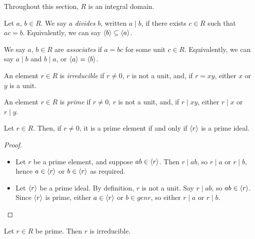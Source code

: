 \documentclass{../template/note}
\begin{document}
    Throughout this section, $R$ is an integral domain.

    \begin{definition}[Division]
        Let $a$, $b \in R$. We say $a$ \emph{divides} $b$, written $a \mid b$, if there exists $c \in R$ such that $ac = b$. Equivalently, we can say $\left \langle b \right \rangle \subseteq \left \langle a \right \rangle$.
    \end{definition}
    
    \begin{definition}[Associates]
        We say $a$, $b \in R$ are \emph{associates} if $a = bc$ for some unit $c \in R$. Equivalently, we can say $a \mid b$ and $b \mid a$, or $\left \langle a \right \rangle = \left \langle b \right \rangle$.
    \end{definition}
    
    \begin{definition}
        An element $r \in R$ is \emph{irreducible} if $r \neq 0$, $r$ is not a unit, and, if $r = xy$, either $x$ or $y$ is a unit.
    \end{definition}
    
    \begin{definition}
        An element $r \in R$ is \emph{prime} if $r \neq 0$, $r$ is not a unit, and, if $r \mid xy$, either $r \mid x$ or $r \mid y$.
    \end{definition}
    
    \begin{proposition}
        Let $r \in R$. Then, if $r \neq 0$, it is a prime element if and only if $\left \langle r \right \rangle$ is a prime ideal.
    \end{proposition}
    
    \begin{proof}
        \begin{itemize}
            \item[$\implies$] Let $r$ be a prime element, and suppose $ab \in \left \langle r \right \rangle$. Then $r \mid ab$, so $r \mid a$ or $r \mid b$, hence $a \in \left \langle r \right \rangle$ or $b \in \left \langle r \right \rangle$ as required.
            \item[$\impliedby$] Let $\left \langle r \right \rangle$ be a prime ideal. By definition, $r$ is not a unit. Say $r \mid ab$, so $ab \in \left \langle r \right \rangle$. Since $\left \langle r \right \rangle$ is prime, either $a \in \left \langle r \right \rangle$ or $b \in gen r$, so either $r \mid a$ or $r \mid b$. 
        \end{itemize}
    \end{proof}
    
    \begin{proposition}
        Let $r \in R$ be prime. Then $r$ is irreducible.
    \end{proposition}
    
\end{document}
